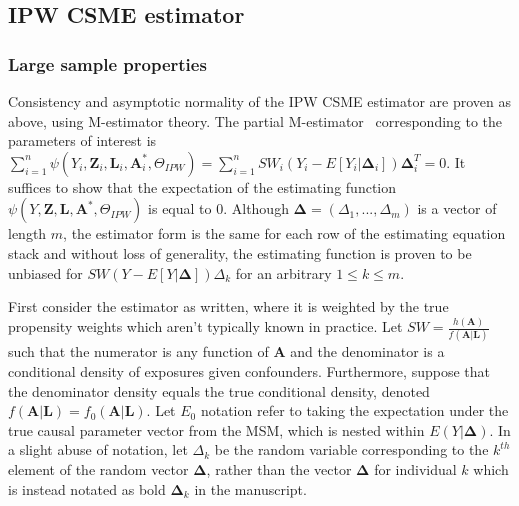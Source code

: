 \documentclass[12pt]{article}
\begin{document}
\subsection{IPW CSME estimator}

\subsubsection{Large sample properties}

Consistency and asymptotic normality of the IPW CSME estimator are proven as above, using M-estimator theory. The partial M-estimator~\citep{stefanski2002} corresponding to the parameters of interest is $\sum_{i=1}^{n} \psi(Y_{i}, \bm{Z}_{i}, \bm{L}_{i}, \bm{A}^{*}_{i}, \Theta_{IPW}) = \sum_{i=1}^{n} SW_{i}(Y_{i} - E[Y_{i} | \bm{\Delta}_{i}])\bm{\Delta}_{i}^{T} = 0$. It suffices to show that the expectation of the estimating function $\psi(Y, \bm{Z}, \bm{L}, \bm{A}^{*}, \Theta_{IPW})$ is equal to 0. Although $\bm{\Delta} = (\Delta_{1}, ..., \Delta_{m})$ is a vector of length $m$, the estimator form is the same for each row of the estimating equation stack and without loss of generality, the estimating function is proven to be unbiased for $SW(Y - E[Y | \bm{\Delta}])\Delta_{k}$ for an arbitrary $1 \leq k \leq m$.

First consider the estimator as written, where it is weighted by the true propensity weights which aren't typically known in practice. Let $SW = \frac{h(\bm{A})}{f(\bm{A} | \bm{L})}$ such that the numerator is any function of $\bm{A}$ and the denominator is a conditional density of exposures given confounders. Furthermore, suppose that the denominator density equals the true conditional density, denoted $f(\bm{A} | \bm{L}) = f_{0}(\bm{A} | \bm{L})$. Let $E_{0}$ notation refer to taking the expectation under the true causal parameter vector from the MSM, which is nested within $E(Y | \bm{\Delta})$. In a slight abuse of notation, let $\Delta_{k}$ be the random variable corresponding to the $k^{th}$ element of the random vector $\bm{\Delta}$, rather than the vector $\bm{\Delta}$ for individual $k$ which is instead notated as bold $\bm{\Delta}_{k}$ in the manuscript.
\end{document}
